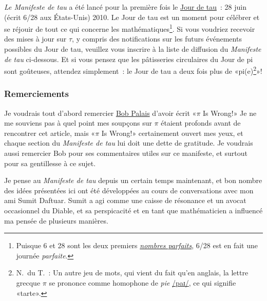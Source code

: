 \emph{Le Manifeste de tau} a été lancé pour la première fois le
\href{https://tauday.com/}{Jour de tau}~: 28 juin (écrit 6/28 aux États-Unis)
2010. Le Jour de tau est un moment pour célébrer et se réjouir de tout ce qui
concerne les mathématiques\ns\footnote{Puisque 6 et 28 sont les deux premiers
\href{https://fr.wikipedia.org/wiki/Nombre_parfait}{\emph{nombres parfaits}},
6/28 est en fait une journée \emph{parfaite}.}. Si vous voudriez recevoir des
mises à jour sur $\tau$, y compris des notifications sur les futurs événements
possibles du Jour de tau, veuillez vous inscrire à la liste de diffusion du
\emph{Manifeste de tau} ci-dessous. Et si vous pensez que les pâtisseries
circulaires du Jour de pi sont goûteuses, attendez simplement~: le Jour de tau a
deux fois plus de «\ns pi(e)\ns\footnote{N.\ du T.~: Un autre jeu de mots,
qui vient du fait qu'en anglais, la lettre grecque $\pi$ se prononce comme
homophone de \emph{pie}
\href{https://fr.wikipedia.org/wiki/Alphabet_phonétique_international}{/paɪ/},
ce qui signifie «\ns tarte\ns ».}\ns »\ns!


  \subsubsection{Remerciements} %
  \label{sec:acknowledgments}

Je voudrais tout d'abord remercier \href{https://www.math.utah.edu/~palais}{Bob
Palais} d'avoir écrit «\ns $\pi$ Is Wrong!\ns » Je ne me souviens pas à quel point
mes soupçons sur $\pi$ étaient profonds avant de rencontrer cet article, mais
«\ns $\pi$ Is Wrong!\ns » certainement ouvert mes yeux, et chaque section du
\emph{Manifeste de tau} lui doit une dette de gratitude. Je voudrais aussi
remercier Bob pour ses commentaires utiles sur ce manifeste, et surtout pour sa
gentillesse à ce sujet.

Je pense au \emph{Manifeste de tau} depuis un certain temps maintenant, et bon
nombre des idées présentées ici ont été développées au cours de conversations
avec mon ami Sumit Daftuar. Sumit a agi comme une caisse de résonance et un
avocat occasionnel du Diable, et sa perspicacité et en tant que mathématicien a
influencé ma pensée de plusieurs manières.

